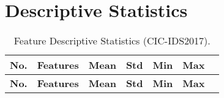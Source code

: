 \section{Descriptive Statistics}\label{appendix:descriptive_statistics}

\begin{center}
    \begin{longtable}{|l|l|l|l|l|l|l|}
        \caption{Feature Descriptive Statistics (CIC-IDS2017).} \\
        \hline
        \textbf{No.} & \textbf{Features} & \textbf{Mean} & \textbf{Std} & \textbf{Min} & \textbf{Max} \\
        \hline
        \endfirsthead

        \hline
        \textbf{No.} & \textbf{Features} & \textbf{Mean} & \textbf{Std} & \textbf{Min} & \textbf{Max} \\
        \hline
        \endhead


\end{longtable}
\end{center}
